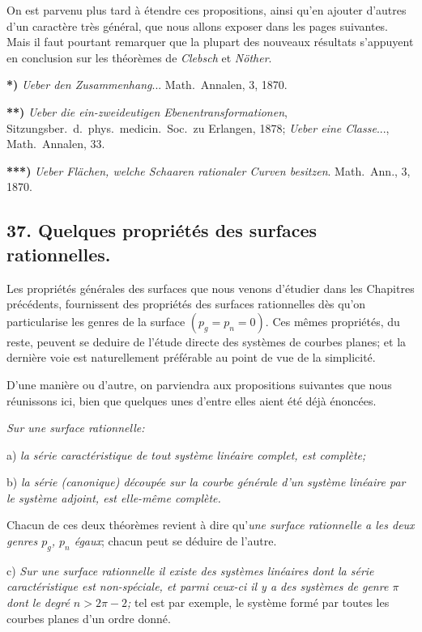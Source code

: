 \documentclass{article}
\begin{document}
On est parvenu plus tard à étendre ces propositions, ainsi qu'en ajouter d'autres d'un caractère très général, que nous allons exposer dans les pages suivantes. Mais il faut pourtant remarquer que la plupart des nouveaux résultats s'appuyent en conclusion sur les théorèmes de \emph{Clebsch} et \emph{Nöther}.

\textbf{*)} \emph{Ueber den Zusammenhang}... Math.\ Annalen, 3, 1870.

\textbf{**)} \emph{Ueber die ein-zweideutigen Ebenentransformationen}, Sitzungsber.\ d.\ phys.\ medicin.\ Soc.\ zu Erlangen, 1878; \emph{Ueber eine Classe}..., Math.\ Annalen, 33.

\textbf{***)} \emph{Ueber Flächen, welche Schaaren rationaler Curven besitzen}. Math.\ Ann., 3, 1870.


\subsection*{37. Quelques propriétés des surfaces rationnelles.}

Les propriétés générales des surfaces que nous venons d'étudier dans les Chapitres précédents, fournissent des propriétés des surfaces rationnelles dès qu'on particularise les genres de la surface $(p_{g} = p_{n} = 0)$. Ces mêmes propriétés, du reste, peuvent se deduire de l'étude directe des systèmes de courbes planes; et la dernière voie est naturellement préférable au point de vue de la simplicité.

D'une manière ou d'autre, on parviendra aux propositions suivantes que nous réunissons ici, bien que quelques unes d'entre elles aient été déjà énoncées.

\emph{Sur une surface rationnelle:}

a) \emph{la série caractéristique de tout système linéaire complet, est complète;}

b) \emph{la série (canonique) découpée sur la courbe générale d'un système linéaire par le système adjoint, est elle-même complète.}

Chacun de ces deux théorèmes revient à dire qu'\emph{une surface rationnelle a les deux genres $p_{g}$, $p_{n}$ égaux}; chacun peut se déduire de l'autre.

c) \emph{Sur une surface rationnelle il existe des systèmes linéaires dont la série caractéristique est non-spéciale, et parmi ceux-ci il y a des systèmes de genre $\pi$ dont le degré $n > 2\pi - 2$;} tel est par exemple, le système formé par toutes les courbes planes d'un ordre donné.
\end{document}
